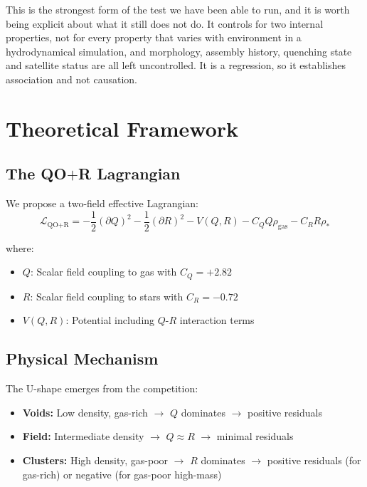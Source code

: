 \documentclass[12pt,a4paper]{article}
\newcommand{\QOR}{QO$+$R}
\newcommand{\Lqor}{\mathcal{L}_{\text{QO}+\text{R}}}
\begin{document}
This is the strongest form of the test we have been able to run, and it is worth being explicit about what it still does not do. It controls for two internal properties, not for every property that varies with environment in a hydrodynamical simulation, and morphology, assembly history, quenching state and satellite status are all left uncontrolled. It is a regression, so it establishes association and not causation.

\section{Theoretical Framework}
\label{sec:theory}

\subsection{The \QOR{} Lagrangian}

We propose a two-field effective Lagrangian:
\begin{equation}
\Lqor = -\frac{1}{2}(\partial Q)^2 - \frac{1}{2}(\partial R)^2 - V(Q,R) - C_Q Q \rho_{\text{gas}} - C_R R \rho_*
\label{eq:lagrangian}
\end{equation}

where:
\begin{itemize}
    \item $Q$: Scalar field coupling to gas with $C_Q = +2.82$
    \item $R$: Scalar field coupling to stars with $C_R = -0.72$
    \item $V(Q,R)$: Potential including $Q$-$R$ interaction terms
\end{itemize}

\subsection{Physical Mechanism}

The U-shape emerges from the competition:
\begin{itemize}
    \item \textbf{Voids:} Low density, gas-rich $\rightarrow$ $Q$ dominates $\rightarrow$ positive residuals
    \item \textbf{Field:} Intermediate density $\rightarrow$ $Q \approx R$ $\rightarrow$ minimal residuals
    \item \textbf{Clusters:} High density, gas-poor $\rightarrow$ $R$ dominates $\rightarrow$ positive residuals (for gas-rich) or negative (for gas-poor high-mass)
\end{itemize}
\end{document}
